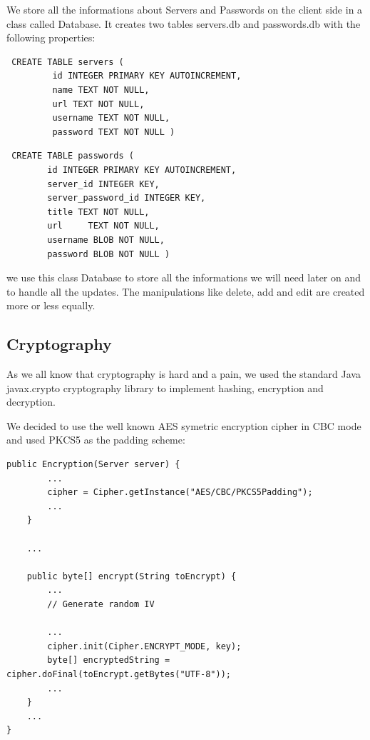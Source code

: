 \documentclass{report}
\begin{document}
We store all the informations about Servers and Passwords on the client side in a class called Database. It creates two tables servers.db and passwords.db with the following properties:

\begin{lstlisting}     
 CREATE TABLE servers ( 
         id INTEGER PRIMARY KEY AUTOINCREMENT, 
         name TEXT NOT NULL, 
         url TEXT NOT NULL, 
         username TEXT NOT NULL, 
         password TEXT NOT NULL ) 
\end{lstlisting}
\begin{lstlisting} 	
 CREATE TABLE passwords (
        id INTEGER PRIMARY KEY AUTOINCREMENT,
        server_id INTEGER KEY,
        server_password_id INTEGER KEY, 
        title TEXT NOT NULL,
        url 	TEXT NOT NULL,
        username BLOB NOT NULL,
        password BLOB NOT NULL )
\end{lstlisting}

we use this class Database to store all the informations we will need later on and to handle all the updates. The manipulations like delete, add and edit are created more or less equally.

\subsection{Cryptography}
As we all know that cryptography is hard and a pain, we used the standard Java javax.crypto cryptography library to implement hashing, encryption and decryption.

We decided to use the well known AES symetric encryption cipher in CBC mode and used PKCS5 as the padding scheme:

\begin{lstlisting}
public Encryption(Server server) {
        ...
        cipher = Cipher.getInstance("AES/CBC/PKCS5Padding");
        ...
    }
    
    ...
    
    public byte[] encrypt(String toEncrypt) {
        ...
        // Generate random IV
        
		...        
        cipher.init(Cipher.ENCRYPT_MODE, key);
        byte[] encryptedString = cipher.doFinal(toEncrypt.getBytes("UTF-8"));
        ...
    }
    ...
}
\end{lstlisting}
\end{document}
